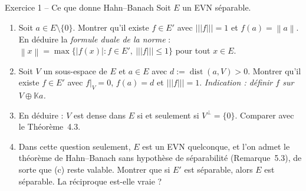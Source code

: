 \documentclass[11pt,a4paper]{article}
\newcommand{\K}{\mathbb{K}}
\newcommand{\dist}{\operatorname{dist}}
\newcommand{\norm}[1]{\left\|#1\right\|}
\newcommand{\opnorm}[1]{|\!|\!|#1|\!|\!|}
\theoremstyle{definition}
\begin{document}
\begin{exo}{Exercice 1 -- Ce que donne Hahn--Banach}
Soit $E$ un EVN séparable.
\begin{enumerate}[label=(\alph*)]
  \item Soit $a\in E\setminus\{0\}$. Montrer qu'il existe $f\in E'$ avec $\opnorm f=1$ et $f(a)=\norm a$. En déduire la \emph{formule duale de la norme} : $\norm x=\max\{|f(x)|:f\in E',\ \opnorm f\le1\}$ pour tout $x\in E$.
  \item Soit $V$ un sous-espace de $E$ et $a\in E$ avec $d:=\dist(a,V)>0$. Montrer qu'il existe $f\in E'$ avec $f|_V=0$, $f(a)=d$ et $\opnorm f=1$. \emph{Indication : définir $f$ sur $V\oplus\K a$.}
  \item En déduire : $V$ est dense dans $E$ si et seulement si $V^\perp=\{0\}$. Comparer avec le Théorème~4.3.
  \item Dans cette question seulement, $E$ est un EVN quelconque, et l'on admet le théorème de Hahn--Banach sans hypothèse de séparabilité (Remarque~5.3), de sorte que (c) reste valable. Montrer que si $E'$ est séparable, alors $E$ est séparable. La réciproque est-elle vraie ?
\end{enumerate}
\end{exo}
\end{document}

